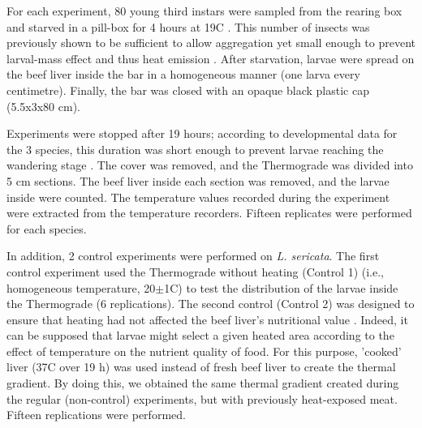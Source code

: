 For each experiment, 80 young third instars were sampled from the rearing box and starved in a pill-box for 4 hours at 19C \cite{charabidze_discontinuous_2013}. This number of insects was previously shown to be sufficient to allow aggregation \cite{boulay_evidence_2013} yet small enough to prevent larval-mass effect and thus heat emission \citep{charabidze_larval-mass_2011,heaton_quantifying_2014}. After starvation, larvae were spread on the beef liver inside the bar in a homogeneous manner (one larva every centimetre). Finally, the bar was closed with an opaque black plastic cap (5.5x3x80 cm).

Experiments were stopped after 19 hours; according to developmental data for the 3 species, this duration was short enough to prevent larvae reaching the wandering stage \citep{greenberg_flies_1991,greenberg_different_1993,grassberger_effect_2001}. The cover was removed, and the Thermograde was divided into 5 cm sections. The beef liver inside each section was removed, and the larvae inside were counted. The temperature values recorded during the experiment were extracted from the temperature recorders. Fifteen replicates were performed for each species.

In addition, 2 control experiments were performed on \textit{L. sericata}. The first control experiment used the Thermograde without heating (Control 1) (i.e., homogeneous temperature, 20$\pm$1C) to test the distribution of the larvae inside the Thermograde (6 replications). The second control (Control 2) was designed to ensure that heating had not affected the beef liver’s nutritional value \cite{rice_effects_1953}. Indeed, it can be supposed that larvae might select a given heated area according to the effect of temperature on the nutrient quality of food. For this purpose, 'cooked' liver (37C over 19 h) was used instead of fresh beef liver to create the thermal gradient. By doing this, we obtained the same thermal gradient created during the regular (non-control) experiments, but with previously heat-exposed meat. Fifteen replications were performed.

